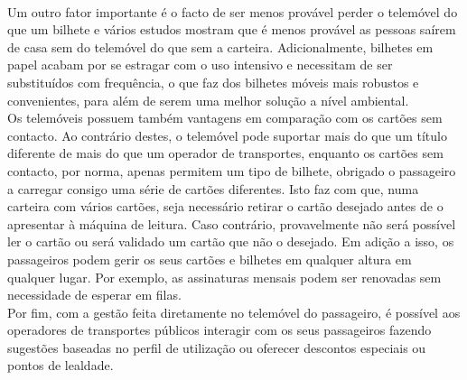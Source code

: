 \\Um outro fator importante é o facto de ser menos provável perder o telemóvel do que um bilhete e vários estudos mostram que é menos provável as pessoas saírem de casa sem do telemóvel do que sem a carteira. Adicionalmente, bilhetes em papel acabam por se estragar com o uso intensivo e necessitam de ser substituídos com frequência, o que faz dos bilhetes móveis mais robustos e convenientes, para além de serem uma melhor solução a nível ambiental.
\\Os telemóveis possuem também vantagens em comparação com os cartões sem contacto. Ao contrário destes, o telemóvel pode suportar mais do que um título diferente de mais do que um operador de transportes, enquanto os cartões sem contacto, por norma, apenas permitem um tipo de bilhete, obrigado o passageiro a carregar consigo uma série de cartões diferentes. Isto faz com que, numa carteira com vários cartões, seja necessário retirar o cartão desejado antes de o apresentar à máquina de leitura. Caso contrário, provavelmente não será possível ler o cartão ou será validado um cartão que não o desejado. Em adição a isso, os passageiros podem gerir os seus cartões e bilhetes em qualquer altura em qualquer lugar. Por exemplo, as assinaturas mensais podem ser renovadas sem necessidade de esperar em filas.\cite{NFCForum2011}
\\Por fim, com a gestão feita diretamente no telemóvel do passageiro, é possível aos operadores de transportes públicos interagir com os seus passageiros fazendo sugestões baseadas no perfil de utilização ou oferecer descontos especiais ou pontos de lealdade.\cite{Ferreira2012}